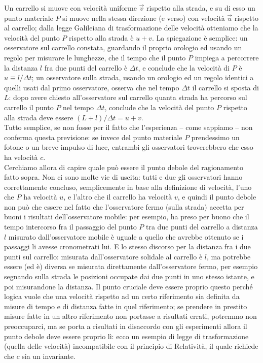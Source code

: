 Un carrello si muove con velocit\`a uniforme $\vec v$ rispetto alla strada, e su
di esso un punto materiale $P$ si muove nella stessa direzione (e verso) con
velocit\`a $\vec u$ rispetto al carrello; dalla legge Galileiana di
trasformazione delle velocit\`a otteniamo che la velocit\`a del punto $P$
rispetto alla strada \`e $u+v$. La spiegazione \`e semplice: un osservatore sul
carrello constata, guardando il proprio orologio ed usando un regolo per
misurare le lunghezze, che il tempo che il punto $P$ impiega a percorrere la
distanza $l$ fra due punti del carrello \`e $\Delta t$, e conclude che la
velocit\`a di $P$ \`e $u\equiv l/\Delta t$; un osservatore sulla strada, usando
un orologio ed un regolo identici a quelli usati dal primo osservatore, osserva
che nel tempo $\Delta t$ il carrello si sposta di $L$: dopo avere chiesto
all'osservatore sul carrello quanta strada ha percorso sul carrello il punto $P$
nel tempo $\Delta t$, conclude che la velocit\`a del punto $P$ rispetto alla
strada deve essere $(L+l)/\Delta t=u+v$.\\
Tutto semplice, se non fosse per il fatto che l'esperienza -- come sappiamo --
non conferma questa previsione: se invece del punto materiale $P$ prendessimo un
fotone o un breve impulso di luce, entrambi gli osservatori troverebbero che
esso ha velocit\`a $c$.\\
Cerchiamo allora di capire quale pu\`o essere il punto debole del ragionamento
fatto sopra. Non ci sono molte vie di uscita: tutti e due gli osservatori hanno
correttamente concluso, semplicemente in base alla definizione di velocit\`a,
l'uno che $P$ ha velocit\`a $u$, e l'altro che il carrello ha velocit\`a $v$, e
quindi il punto debole non pu\`o che essere nel fatto che l'osservatore fermo
(sulla strada) accetta per buoni i risultati dell'osservatore mobile: per
esempio, ha preso per buono che il tempo intercorso fra il passaggio del punto
$P$ tra due punti del carrello a distanza $l$ misurato dall'osservatore mobile
\`e uguale a quello che avrebbe ottenuto se i passaggi li avesse cronometrati
lui. E lo stesso discorso per la distanza fra i due punti sul carrello: misurata
dall'osservatore solidale al carrello \`e $l$, ma potrebbe essere (ed \`e)
diversa se misurata direttamente dall'osservatore fermo, per esempio segnando
sulla strada le posizioni occupate dai due punti in uno stesso istante, e poi
misurandone la distanza. Il punto cruciale deve essere proprio questo perch\'e
logica vuole che una velocit\`a rispetto ad un certo riferimento sia definita da
misure di tempo e di distanza fatte in quel riferimento; se prendere in prestito
misure fatte in un altro riferimento non portasse a risultati errati, potremmo
non preoccuparci, ma se porta a risultati in disaccordo con gli esperimenti
allora il punto debole deve essere proprio l\`i: ecco un esempio di legge di
trasformazione (quella delle velocit\`a) incompatibile con il principio di
Relativit\`a, il quale richiede che $c$ sia un invariante.

